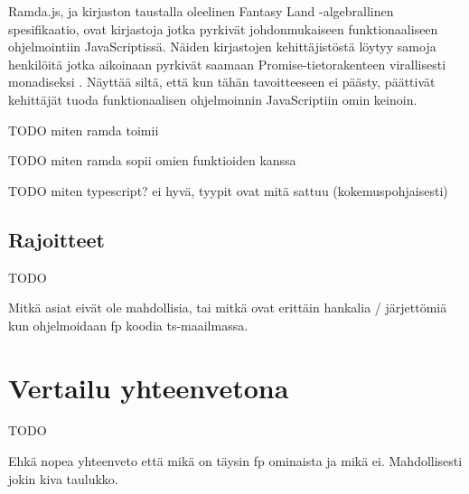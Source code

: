 Ramda.js, ja kirjaston taustalla oleelinen Fantasy Land -algebrallinen spesifikaatio, ovat kirjastoja jotka pyrkivät johdonmukaiseen funktionaaliseen ohjelmointiin JavaScriptissä. Näiden kirjastojen kehittäjistöstä löytyy samoja henkilöitä jotka aikoinaan pyrkivät saamaan Promise-tietorakenteen virallisesti monadiseksi \cite{ramda:contributors,fantasy-land:contributors,promises-spec-94}. Näyttää siltä, että kun tähän tavoitteeseen ei päästy, päättivät kehittäjät tuoda funktionaalisen ohjelmoinnin JavaScriptiin omin keinoin.

TODO miten ramda toimii

TODO miten ramda sopii omien funktioiden kanssa

TODO miten typescript? ei hyvä, tyypit ovat mitä sattuu (kokemuspohjaisesti)

\subsection{Rajoitteet}

TODO

Mitkä asiat eivät ole mahdollisia, tai mitkä ovat erittäin hankalia / järjettömiä kun ohjelmoidaan fp koodia \gls{ts}-maailmassa.


\section{Vertailu yhteenvetona}

TODO

Ehkä nopea yhteenveto että mikä on täysin fp ominaista ja mikä ei. Mahdollisesti jokin kiva taulukko.